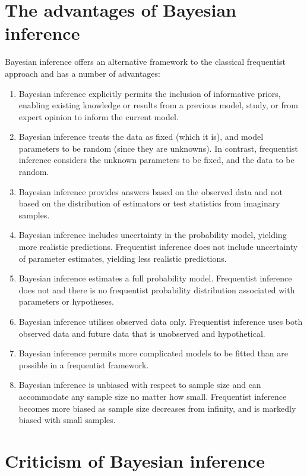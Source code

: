 \documentclass[
]{book}
\begin{document}
\hypertarget{bayes-pros}{%
\section{The advantages of Bayesian inference}\label{bayes-pros}}

Bayesian inference offers an alternative framework to the classical frequentist approach and has a number of advantages:

\begin{enumerate}
\def\labelenumi{\arabic{enumi}.}
\item
  Bayesian inference explicitly permits the inclusion of informative priors, enabling existing knowledge or results from a previous model, study, or from expert opinion to inform the current model.
\item
  Bayesian inference treats the data as fixed (which it is), and model parameters to be random (since they are unknowns). In contrast, frequentist inference considers the unknown parameters to be fixed, and the data to be random.
\item
  Bayesian inference provides answers based on the observed data and not based on the distribution of estimators or test statistics from imaginary samples.
\item
  Bayesian inference includes uncertainty in the probability model, yielding more realistic predictions. Frequentist inference does not include uncertainty of parameter estimates, yielding less realistic predictions.
\item
  Bayesian inference estimates a full probability model. Frequentist inference does not and there is no frequentist probability distribution associated with parameters or hypotheses.
\item
  Bayesian inference utilises observed data only. Frequentist inference uses both observed data and future data that is unobserved and hypothetical.
\item
  Bayesian inference permits more complicated models to be fitted than are possible in a frequentist framework.
\item
  Bayesian inference is unbiased with respect to sample size and can accommodate any sample size no matter how small. Frequentist inference becomes more biased as sample size decreases from infinity, and is markedly biased with small samples.
\end{enumerate}

\hypertarget{bayes-critics}{%
\section{Criticism of Bayesian inference}\label{bayes-critics}}
\end{document}
